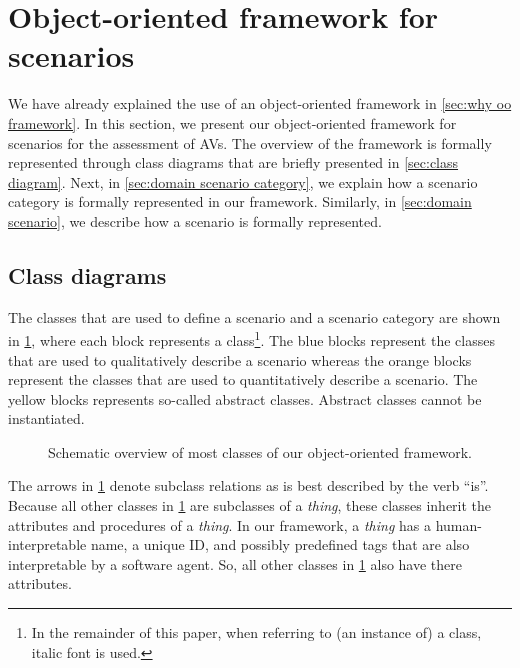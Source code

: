 \cstartb
\section{Object-oriented framework for scenarios}
\label{sec:oo framework}
\cendb

We have already explained the use of an \cstartb object-oriented framework \cendb in \cref{sec:why oo framework}. In this section, we present our \cstartb object-oriented framework \cendb for scenarios for the assessment of AVs. 
The \cstartb overview of the framework \cendb is formally represented through \cstartb class diagrams \cendb that are briefly presented in \cref{sec:class diagram}. Next, in \cref{sec:domain scenario category}, we explain how a scenario category is formally represented \cstartb in our framework\cendb. Similarly, in \cref{sec:domain scenario}, we describe how a scenario is formally represented. 



\cstartb
\subsection{Class diagrams}\cendb
\label{sec:class diagram}

The classes that are used to define a scenario and a scenario category are shown in \cref{fig:class overview}, where each block represents a class\footnote{In the remainder of this paper, when referring to (an instance of) a class, italic font is used.}.
The blue blocks represent the classes that are used to qualitatively describe a scenario whereas the orange blocks represent the classes that are used to quantitatively describe a scenario. \cstartb The yellow blocks represents so-called abstract classes. Abstract classes cannot be instantiated. \cendb

\begin{figure}[t]
	\centering
	
	\caption{\color{red}Schematic overview of most classes of our object-oriented framework.\color{black}}
	\label{fig:class overview}
\end{figure}

The arrows in \cref{fig:class overview} denote subclass relations as is best described by the verb ``is''. Because all other classes in \cref{fig:class overview} are subclasses of a \textit{thing}, these classes inherit the attributes and procedures of a \textit{thing}. In our framework, a \textit{thing} has a human-interpretable name, a unique ID, and possibly predefined tags that are also interpretable by a software agent. So, all other classes in \cref{fig:class overview} also have there attributes. 

